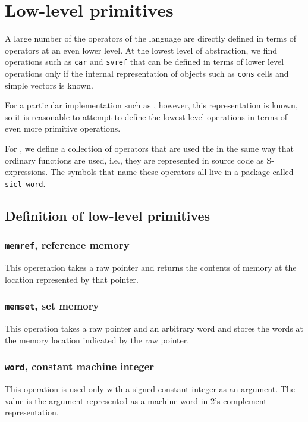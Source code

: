 \chapter{Low-level primitives}
\label{chap-low-level-primitives}

A large number of the operators of the \cl{} language are directly
defined in terms of operators at an even lower level.  At the lowest
level of abstraction, we find operations such as \texttt{car} and
\texttt{svref} that can be defined in terms of lower level operations
only if the internal representation of objects such as \texttt{cons}
cells and simple vectors is known.

For a particular implementation such as \sysname{}, however, this
representation is known, so it is reasonable to attempt to define the
lowest-level \cl{} operations in terms of even more primitive
operations. 

For \sysname{}, we define a collection of operators that are used the
in the same way that ordinary \cl{} functions are used, i.e., they are
represented in source code as S-expressions.  The symbols that name
these operators all live in a package called \texttt{sicl-word}.  

\section{Definition of low-level primitives}

\subsection{\texttt{memref}, reference memory}

This opereration takes a raw pointer and returns the contents of
memory at the location represented by that pointer.

\subsection{\texttt{memset}, set memory}

This operation takes a raw pointer and an arbitrary word and stores
the words at the memory location indicated by the raw pointer.

\subsection{\texttt{word}, constant machine integer}

This operation is used only with a signed constant integer as an
argument.  The value is the argument represented as a machine word in
2's complement representation.

